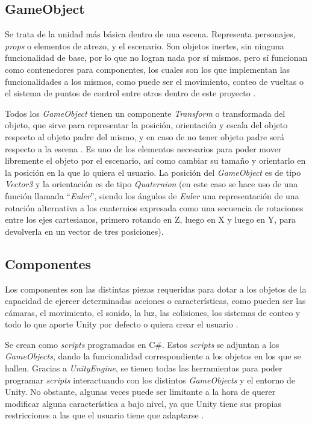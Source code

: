 \subsection{GameObject}

Se trata de la unidad más básica dentro de una escena. Representa personajes, \textit{props} o elementos de atrezo, y el escenario. Son objetos inertes, sin ninguna funcionalidad de base, por lo que no logran nada por sí mismos, pero sí funcionan como contenedores para componentes, los cuales son los que implementan las funcionalidades a los mismos, como puede ser el movimiento, conteo de vueltas o el sistema de puntos de control entre otros dentro de este proyecto \cite{doc:gameobject}.

Todos los \textit{GameObject} tienen un componente \textit{Transform} o transformada del objeto, que sirve para representar la posición, orientación y escala del objeto respecto al objeto padre del mismo, y en caso de no tener objeto padre será respecto a la escena \cite{doc:transform}. Es uno de los elementos necesarios para poder mover libremente el objeto por el escenario, así como cambiar su tamaño y orientarlo en la posición en la que lo quiera el usuario. La posición del \textit{GameObject} es de tipo \textit{Vector3} y la orientación es de tipo \textit{Quaternion} (en este caso se hace uso de una función llamada ``\textit{Euler}'', siendo los ángulos de \textit{Euler} una representación de una rotación alternativa a los cuaternios expresada como una secuencia de rotaciones entre los ejes cartesianos, primero rotando en Z, luego en X y luego en Y, para devolverla en un vector de tres posiciones).

\subsection{Componentes}

Los componentes son las distintas piezas requeridas para dotar a los objetos de la capacidad de ejercer determinadas acciones o características, como pueden ser las cámaras, el movimiento, el sonido, la luz, las colisiones, los sistemas de conteo y todo lo que aporte Unity por defecto o quiera crear el usuario \cite{doc:component}.

Se crean como \textit{scripts} programados en C\#. Estos \textit{scripts} se adjuntan a los \textit{GameObjects}, dando la funcionalidad correspondiente a los objetos en los que se hallen. Gracias a \textit{UnityEngine}, se tienen todas las herramientas para poder programar \textit{scripts} interactuando con los distintos \textit{GameObjects} y el entorno de Unity. No obstante, algunas veces puede ser limitante a la hora de querer modificar alguna característica a bajo nivel, ya que Unity tiene sus propias restricciones a las que el usuario tiene que adaptarse \cite{doc:scripts}.

